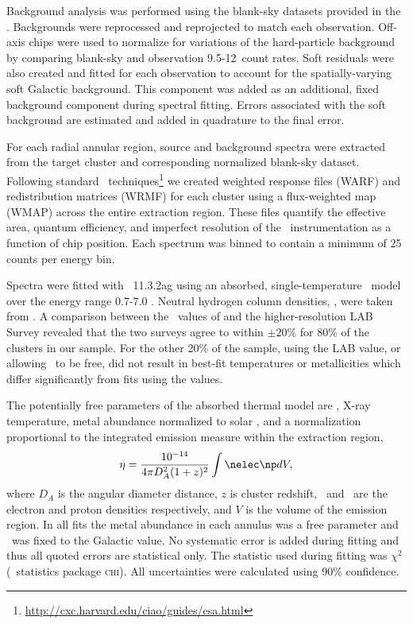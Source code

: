 Background analysis was performed using the blank-sky datasets
provided in the \caldb. Backgrounds were reprocessed and reprojected
to match each observation. Off-axis chips were used to normalize for
variations of the hard-particle background by comparing blank-sky and
observation 9.5-12\keV\ count rates. Soft residuals were also created
and fitted for each observation to account for the spatially-varying
soft Galactic background. This component was added as an additional,
fixed background component during spectral fitting. Errors associated
with the soft background are estimated and added in quadrature to the
final error.

For each radial annular region, source and background spectra were
extracted from the target cluster and corresponding normalized
blank-sky dataset. Following standard
\ciao\ techniques\footnote{\url{http://cxc.harvard.edu/ciao/guides/esa.html}}
we created weighted response files (WARF) and redistribution matrices
(WRMF) for each cluster using a flux-weighted map (WMAP) across the
entire extraction region. These files quantify the effective area,
quantum efficiency, and imperfect resolution of the
\chandra\ instrumentation as a function of chip position. Each
spectrum was binned to contain a minimum of 25 counts per energy bin.

Spectra were fitted with \xspec\ 11.3.2ag \citep{xspec} using an
absorbed, single-temperature \mekal\ model \citep{mekal1, mekal2} over
the energy range 0.7-7.0 \keV. Neutral hydrogen column densities,
\nhi, were taken from \citet{dickeylockman}. A comparison between the
\nhi\ values of \citet{dickeylockman} and the higher-resolution LAB
Survey \citep{lab} revealed that the two surveys agree to within $\pm
20\%$ for 80\% of the clusters in our sample. For the other 20\% of
the sample, using the LAB value, or allowing \nhi\ to be free, did not
result in best-fit temperatures or metallicities which differ
significantly from fits using the \citet{dickeylockman} values.

The potentially free parameters of the absorbed thermal model are
\nhi, X-ray temperature, metal abundance normalized to solar
\citep[elemental ratios taken from]{ag89}, and a normalization
proportional to the integrated emission measure within the extraction
region,
\begin{equation}
\label{eqn:norm}
\eta = \frac{10^{-14}}{4\pi D_A^2(1+z)^2}\int \nelec \np dV,
\end{equation}
where $D_A$ is the angular diameter distance, $z$ is cluster redshift,
\nelec\ and \np\ are the electron and proton densities respectively,
and $V$ is the volume of the emission region. In all fits the metal
abundance in each annulus was a free parameter and \nhi\ was fixed to
the Galactic value. No systematic error is added during fitting and
thus all quoted errors are statistical only. The statistic used during
fitting was $\chi^2$ (\xspec\ statistics package \textsc{chi}). All
uncertainties were calculated using 90\% confidence.

